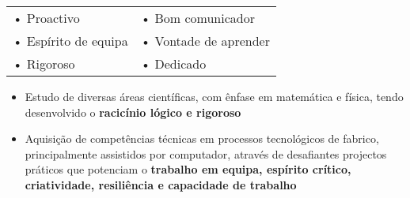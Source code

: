 \documentclass[10pt,a4paper]{altacv}
\begin{document}
\tagline{}

\begin{fullwidth}
\makecvheader
\end{fullwidth}


\smallskip

\begin{tabularx}{\linewidth}{X X}
	• Proactivo & • Bom comunicador  \\
	• Espírito de equipa         & • Vontade de aprender     \\
	• Rigoroso    & • Dedicado
\end{tabularx}




\medskip

\begin{itemize}
	\item Estudo de diversas áreas científicas, com ênfase em matemática e física, tendo desenvolvido o \textbf{racicínio lógico e rigoroso}
	\item Aquisição de competências técnicas em processos tecnológicos de fabrico, principalmente assistidos por computador, através de desafiantes projectos práticos que potenciam o \textbf{trabalho em equipa, espírito crítico, criatividade, resiliência e capacidade de trabalho}
\end{itemize}
\end{document}
